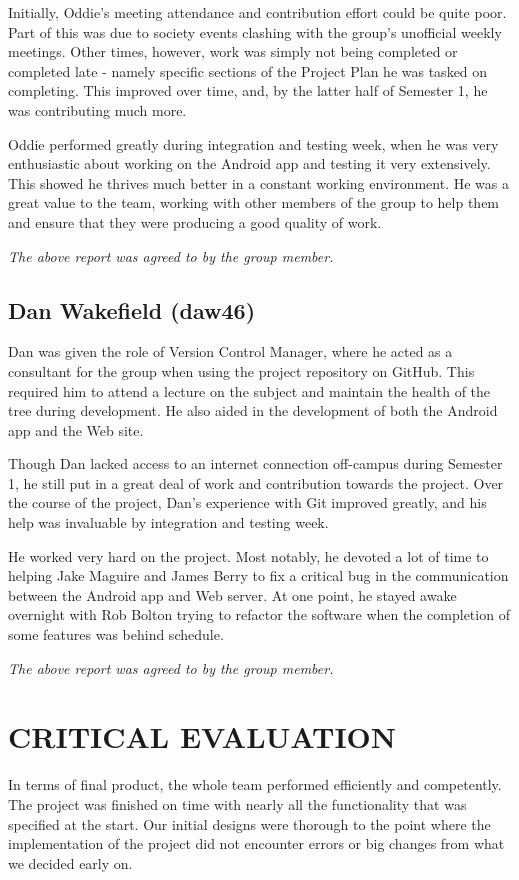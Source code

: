 \documentclass{project}
\begin{document}
Initially, Oddie's meeting attendance and contribution effort could be quite poor. Part of this was due to society events clashing with the group's unofficial weekly meetings. Other times, however, work was simply not being completed or completed late - namely specific sections of the Project Plan he was tasked on completing. This improved over time, and, by the latter half of Semester 1, he was contributing much more.

Oddie performed greatly during integration and testing week, when he was very enthusiastic about working on the Android app and testing it very extensively. This showed he thrives much better in a constant working environment. He was a great value to the team, working with other members of the group to help them and ensure that they were producing a good quality of work.

\emph{The above report was agreed to by the group member.}


\newpage


\subsection{Dan Wakefield (daw46)}
Dan was given the role of Version Control Manager, where he acted as a consultant for the group when using the project repository on GitHub. This required him to attend a lecture on the subject and maintain the health of the tree during development. He also aided in the development of both the Android app and the Web site.

Though Dan lacked access to an internet connection off-campus during Semester 1, he still put in a great deal of work and contribution towards the project. Over the course of the project, Dan’s experience with Git improved greatly, and his help was invaluable by integration and testing week. 

He worked very hard on the project. Most notably, he devoted a lot of time to helping Jake Maguire and James Berry to fix a critical bug in the communication between the Android app and Web server. At one point, he stayed awake overnight with Rob Bolton trying to refactor the software when the completion of some features was behind schedule.

\emph{The above report was agreed to by the group member.}


\newpage


\section{CRITICAL EVALUATION}
In terms of final product, the whole team performed efficiently and competently. The project was finished on time with nearly all the functionality that was specified at the start. Our initial designs were thorough to the point where the implementation of the project did not encounter errors or big changes from what we decided early on.
\end{document}
